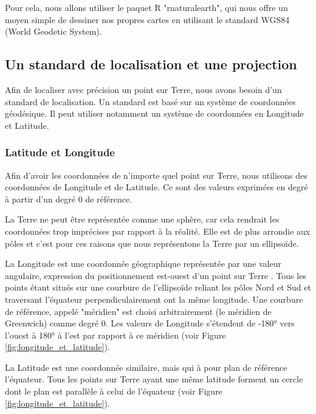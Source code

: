 \documentclass{article}
\begin{document}
Pour cela, nous allons utiliser le paquet R "rnaturalearth", qui nous offre un moyen simple de dessiner nos propres cartes en utilisant le standard WGS84 (World Geodetic System).

\subsection{Un standard de localisation et une projection}

Afin de localiser avec précision un point sur Terre, nous avons besoin d'un standard de localisation. Un standard est basé sur un système de coordonnées géodésique. Il peut utiliser notamment un système de coordonnées en Longitude et Latitude.

\subsubsection{Latitude et Longitude}

Afin d'avoir les coordonnées de n'importe quel point sur Terre, nous utilisons des coordonnées de Longitude et de Latitude. Ce sont des valeurs exprimées en degré à partir d'un degré 0 de référence.

La Terre ne peut être représentée comme une sphère, car cela rendrait les coordonnées trop imprécises par rapport à la réalité. Elle est de plus arrondie aux pôles et c'est pour ces raisons que nous représentons la Terre par un ellipsoïde. 

La Longitude est une coordonnée géographique représentée par une valeur angulaire, expression du positionnement est-ouest d'un point sur Terre \cite{frwiki:188614923}. Tous les points étant situés sur une courbure de l'ellipsoïde reliant les pôles Nord et Sud et traversant l'équateur perpendiculairement ont la même longitude. Une courbure de référence, appelé "méridien" est choisi arbitrairement (le méridien de Greenwich) comme degré 0. Les valeurs de Longitude s'étendent de -180° vers l'ouest à 180° à l'est par rapport à ce méridien (voir Figure \ref{fig:longitude_et_latitude}). 

La Latitude est une coordonnée similaire, mais qui à pour plan de référence l'équateur. Tous les points sur Terre ayant une même latitude forment un cercle dont le plan est parallèle à celui de l'équateur \cite{frwiki:189341688} (voir Figure \ref{fig:longitude_et_latitude}). 
\end{document}
